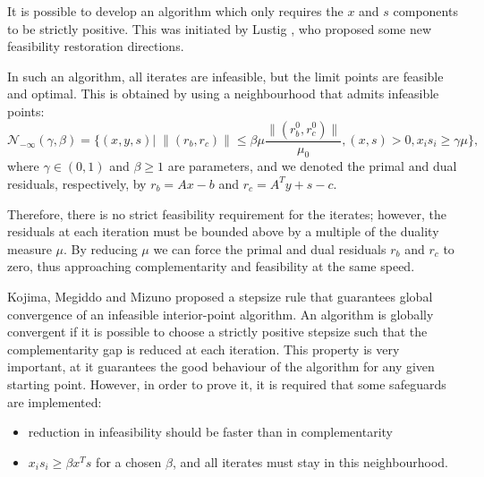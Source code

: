 
It is possible to develop an algorithm which only requires 
the $x$ and $s$ components to be strictly positive. 
This was initiated by Lustig \cite{Lustig91}, who proposed some
new feasibility restoration directions.


In such 
an algorithm, all iterates are infeasible, but the limit points 
are feasible and optimal. This is obtained by using a 
neighbourhood that admits infeasible points:
\[
\mathcal{N}_{-\infty}(\gamma,\beta) =\{ (x,y,s) | \; \|(r_b,r_c)\| \le \beta\mu \frac{\|(r_b^0,r_c^0)\|}{\mu_0}, (x,s)>0, x_is_i \ge \gamma\mu \},
\]
where $\gamma\in (0,1)$ and $\beta \ge 1$ are parameters, and 
we denoted the primal and dual residuals, respectively, by 
$r_b = Ax-b$ and $r_c = A^T y + s - c$.

Therefore, there is no strict feasibility requirement for 
the iterates; however, the residuals at each iteration must be 
bounded above by a multiple of the duality measure $\mu$. 
By reducing $\mu$ we can force the primal and dual residuals 
$r_b$ and $r_c$ to zero, thus approaching complementarity and 
feasibility at the same speed.

Kojima, Megiddo and Mizuno \cite{KojimaMegiddoMizuno} proposed 
a stepsize rule that guarantees global convergence of an 
infeasible interior-point algorithm.
An algorithm is globally convergent if it is possible to choose
a strictly positive stepsize such that the complementarity gap
is reduced at each iteration. This property is very important, at it
guarantees the good behaviour of the algorithm for any given starting
point. However, in order to prove it, it is required that some
safeguards are implemented:
\begin{itemize}
\item reduction in infeasibility should be faster than in complementarity
\item $x_i s_i \ge \beta x^Ts$ for a chosen $\beta$, and all iterates must
stay in this neighbourhood.
\end{itemize}


